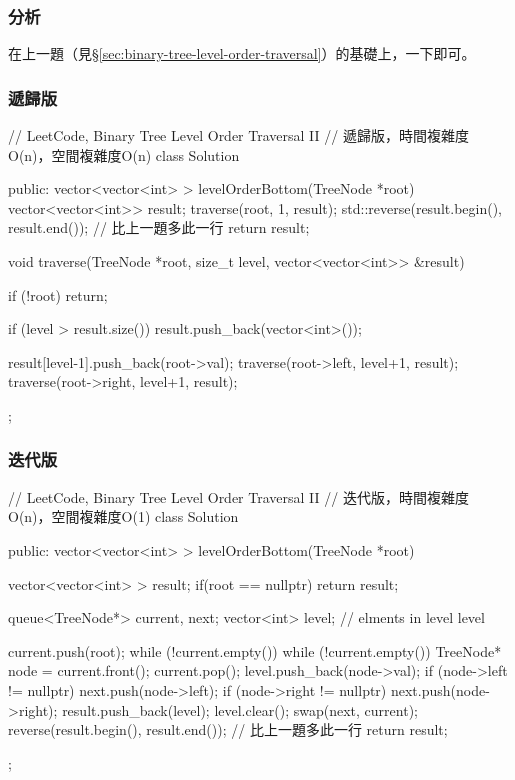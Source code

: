 \subsubsection{分析}
在上一題（見\S \ref{sec:binary-tree-level-order-traversal}）的基礎上，一下即可。


\subsubsection{遞歸版}
\begin{Code}
// LeetCode, Binary Tree Level Order Traversal II
// 遞歸版，時間複雜度O(n)，空間複雜度O(n)
class Solution {
public:
    vector<vector<int> > levelOrderBottom(TreeNode *root) {
        vector<vector<int>> result;
        traverse(root, 1, result);
        std::reverse(result.begin(), result.end()); // 比上一題多此一行
        return result;
    }

    void traverse(TreeNode *root, size_t level, vector<vector<int>> &result) {
        if (!root) return;

        if (level > result.size())
            result.push_back(vector<int>());

        result[level-1].push_back(root->val);
        traverse(root->left, level+1, result);
        traverse(root->right, level+1, result);
    }
};
\end{Code}


\subsubsection{迭代版}
\begin{Code}
// LeetCode, Binary Tree Level Order Traversal II
// 迭代版，時間複雜度O(n)，空間複雜度O(1)
class Solution {
public:
    vector<vector<int> > levelOrderBottom(TreeNode *root) {
        vector<vector<int> > result;
        if(root == nullptr) return result;

        queue<TreeNode*> current, next;
        vector<int> level; // elments in level level

        current.push(root);
        while (!current.empty()) {
            while (!current.empty()) {
                TreeNode* node = current.front();
                current.pop();
                level.push_back(node->val);
                if (node->left != nullptr) next.push(node->left);
                if (node->right != nullptr) next.push(node->right);
            }
            result.push_back(level);
            level.clear();
            swap(next, current);
        }
        reverse(result.begin(), result.end()); // 比上一題多此一行
        return result;
    }
};
\end{Code}


